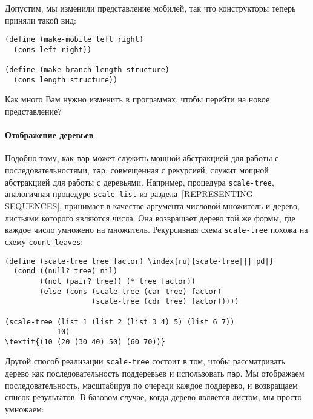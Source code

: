 \begin{exercise}{2.29}
\begin{plainenum}
\item
Допустим, мы изменили представление мобилей, так
  что конструкторы теперь приняли такой вид:

\begin{Verbatim}[fontsize=\small]
(define (make-mobile left right)
  (cons left right))

(define (make-branch length structure)
  (cons length structure))
\end{Verbatim}

Как много Вам нужно изменить в программах, чтобы перейти на новое представление?
\end{plainenum}
\end{exercise}

\paragraph{Отображение деревьев}


%
Подобно тому, как {\tt map} может служить  мощной
абстракцией для работы с последовательностями, {\tt map},
совмещенная с рекурсией, служит мощной абстракцией для работы с
деревьями.  Например, процедура {\tt scale-tree}, аналогичная
процедуре {\tt scale-list} из раздела~\ref{REPRESENTING-SEQUENCES}, принимает в качестве
аргумента числовой множитель и дерево, листьями которого являются
числа.  Она возвращает дерево той же формы, где каждое число умножено 
на множитель.  Рекурсивная схема {\tt scale-tree} похожа на
схему {\tt count-leaves}:


\begin{Verbatim}[fontsize=\small]
(define (scale-tree tree factor) \index{ru}{scale-tree||||pd|}
  (cond ((null? tree) nil)
        ((not (pair? tree)) (* tree factor))
        (else (cons (scale-tree (car tree) factor)
                    (scale-tree (cdr tree) factor)))))

(scale-tree (list 1 (list 2 (list 3 4) 5) (list 6 7))
            10)
\textit{(10 (20 (30 40) 50) (60 70))}
\end{Verbatim}

Другой способ реализации {\tt scale-tree} состоит в том, чтобы  рассматривать дерево как последовательность поддеревьев и 
использовать {\tt map}.  Мы отображаем последовательность,
масштабируя по очереди каждое поддерево, и возвращаем список
результатов.  В базовом случае, когда дерево является листом, мы
просто умножаем:

